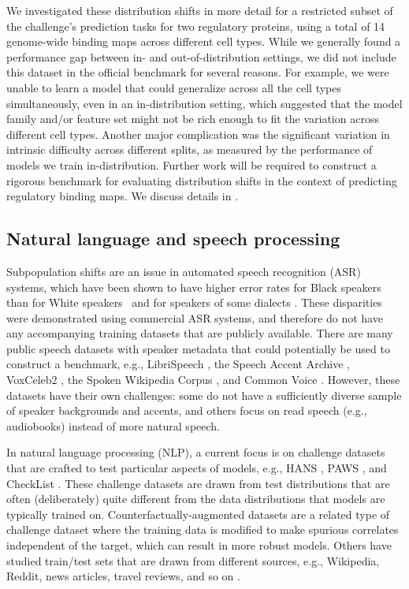 We investigated these distribution shifts in more detail for a restricted subset of the challenge's prediction tasks for two regulatory proteins, using a total of 14 genome-wide binding maps across different cell types.
While we generally found a performance gap between in- and out-of-distribution settings, we did not include this dataset in the official benchmark for several reasons.
For example, we were unable to learn a model that could generalize across all the cell types simultaneously, even in an in-distribution setting,
which suggested that the model family and/or feature set might not be rich enough to fit the variation across different cell types.
Another major complication was the significant variation in intrinsic difficulty across different splits, as measured by the performance of models we train in-distribution.
Further work will be required to construct a rigorous benchmark for evaluating distribution shifts in the context of predicting regulatory binding maps.
We discuss details in .

\subsection{Natural language and speech processing}
Subpopulation shifts are an issue in automated speech recognition (ASR) systems, which have been shown to have higher error rates for Black speakers than for White speakers~\citep{koenecke2020racial} and for speakers of some dialects \citep{tatman2017}.
These disparities were demonstrated using commercial ASR systems, and therefore do not have any accompanying training datasets that are publicly available.
There are many public speech datasets with speaker metadata that could potentially be used to construct a benchmark, e.g., LibriSpeech \citep{panayotov2015librispeech},
the Speech Accent Archive \citep{weinberger2015speech},
VoxCeleb2 \citep{chung2018voxceleb2},
the Spoken Wikipedia Corpus \citep{baumann2019spoken},
and Common Voice \citep{ardila2020common}.
However, these datasets have their own challenges: some do not have a sufficiently diverse sample of speaker backgrounds and accents, and others focus on read speech (e.g., audiobooks) instead of more natural speech.

In natural language processing (NLP), a current focus is on challenge datasets that are crafted to test particular aspects of models,
e.g., HANS \citep{mccoy2019right}, PAWS \citep{zhang2019paws},
and CheckList \citep{ribeiro2020beyond}.
These challenge datasets are drawn from test distributions that are often (deliberately) quite different from the data distributions that models are typically trained on.
Counterfactually-augmented datasets \citep{kaushik2019learning} are a related type of challenge dataset where the training data is modified to make spurious correlates independent of the target, which can result in more robust models.
Others have studied train/test sets that are drawn from different sources, e.g., Wikipedia, Reddit, news articles, travel reviews, and so on \citep{oren2019drolm,miller2020effect,kamath2020squads}.

